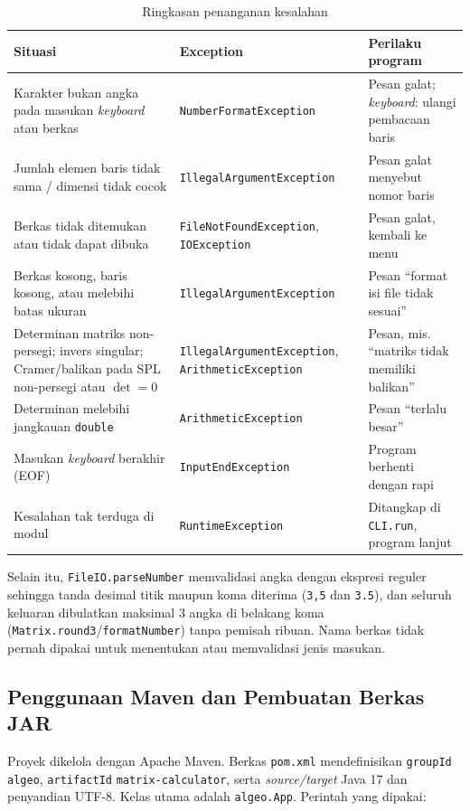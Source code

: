 \documentclass[12pt,a4paper]{article}
\begin{document}
\begin{table}[H]
\centering\small
\renewcommand{\arraystretch}{1.2}
\begin{tabular}{@{}p{4.6cm}p{4.4cm}p{4.6cm}@{}}
\toprule
\textbf{Situasi} & \textbf{Exception} & \textbf{Perilaku program}\\
\midrule
Karakter bukan angka pada masukan \textit{keyboard} atau berkas & \texttt{NumberFormat\-Exception} & Pesan galat; \textit{keyboard}: ulangi pembacaan baris\\
Jumlah elemen baris tidak sama / dimensi tidak cocok & \texttt{IllegalArgument\-Exception} & Pesan galat menyebut nomor baris\\
Berkas tidak ditemukan atau tidak dapat dibuka & \texttt{FileNotFound\-Exception}, \texttt{IOException} & Pesan galat, kembali ke menu\\
Berkas kosong, baris kosong, atau melebihi batas ukuran & \texttt{IllegalArgument\-Exception} & Pesan ``format isi file tidak sesuai''\\
Determinan matriks non-persegi; invers singular; Cramer/balikan pada SPL non-persegi atau $\det=0$ & \texttt{IllegalArgument\-Exception}, \texttt{Arithmetic\-Exception} & Pesan, mis. ``matriks tidak memiliki balikan''\\
Determinan melebihi jangkauan \texttt{double} & \texttt{Arithmetic\-Exception} & Pesan ``terlalu besar''\\
Masukan \textit{keyboard} berakhir (EOF) & \texttt{InputEnd\-Exception} & Program berhenti dengan rapi\\
Kesalahan tak terduga di modul & \texttt{Runtime\-Exception} & Ditangkap di \texttt{CLI.run}, program lanjut\\
\bottomrule
\end{tabular}
\caption{Ringkasan penanganan kesalahan}
\end{table}

Selain itu, \texttt{FileIO.parseNumber} memvalidasi angka dengan ekspresi reguler sehingga tanda desimal titik maupun koma diterima (\texttt{3,5} dan \texttt{3.5}), dan seluruh keluaran dibulatkan maksimal 3 angka di belakang koma (\texttt{Matrix.round3}/\texttt{formatNumber}) tanpa pemisah ribuan. Nama berkas tidak pernah dipakai untuk menentukan atau memvalidasi jenis masukan.

\subsection{Penggunaan Maven dan Pembuatan Berkas JAR}
Proyek dikelola dengan Apache Maven. Berkas \texttt{pom.xml} mendefinisikan \texttt{groupId} \texttt{algeo}, \texttt{artifactId} \texttt{matrix-calculator}, serta \textit{source/target} Java 17 dan penyandian UTF-8. Kelas utama adalah \texttt{algeo.App}. Perintah yang dipakai:
\end{document}
